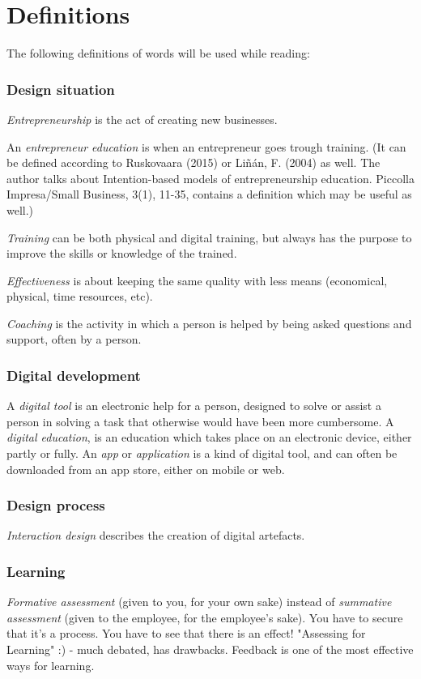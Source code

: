 \section{Definitions} %

The following definitions of words will be used while reading:

\subsubsection{Design situation}
\textit{Entrepreneurship} is the act of creating new businesses.

An \textit{entrepreneur education} is when an entrepreneur goes trough training. (It can be defined according to Ruskovaara (2015) or Liñán, F. (2004) as well. The author talks about Intention-based models of entrepreneurship education. Piccolla Impresa/Small Business, 3(1), 11-35, contains a definition which may be useful as well.)

\textit{Training} can be both physical and digital training, but always has the purpose to improve the skills or knowledge of the trained.

\textit{Effectiveness} is about keeping the same quality with less means (economical, physical, time resources, etc).

\textit{Coaching} is the activity in which a person is helped by being asked questions and support, often by a person.

\subsubsection{Digital development}
A {\textit{digital tool}} is an electronic help for a person, designed to solve or assist a person in solving a task that otherwise would have been more cumbersome.
A \textit{digital education}, is an education which takes place on an electronic device, either partly or fully.
An \textit{app} or \textit{application} is a kind of digital tool, and can often be downloaded from an app store, either on mobile or web.

\subsubsection{Design process}
\textit{Interaction design} describes the creation of digital artefacts.

\subsubsection{Learning}
\textit{Formative assessment} (given to you, for your own sake) instead of \textit{summative assessment} (given to the employee, for the employee's sake). You have to secure that it's a process. You have to see that there is an effect! "Assessing for Learning" :) - much debated, has drawbacks. Feedback is one of the most effective ways for learning.
